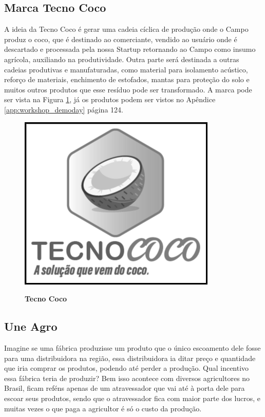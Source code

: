 \subsection{Marca Tecno Coco}

A ideia da Tecno Coco é gerar uma cadeia cíclica de produção onde o Campo produz o coco, que é destinado ao comerciante, vendido ao usuário onde é descartado e processada pela nossa Startup retornando ao Campo como insumo agrícola, auxiliando na produtividade. Outra parte será destinada a outras cadeias produtivas e manufaturadas, como material para isolamento acústico, reforço de materiais, enchimento de estofados, mantas para proteção do solo e muitos outros produtos que esse resíduo pode ser transformado. A marca pode ser vista na Figura \ref{figura_50}, já os produtos podem ser vistos no Apêndice \ref{app:workshop_demoday} página 124.


\begin{figure}[H]
\centering
\caption{\textbf{Tecno Coco}}
\includegraphics[scale=0.45]{Imagens/tecnococo.png}
\label{figura_50}
\end{figure}


\subsection{Une Agro}

Imagine se uma fábrica produzisse um produto que o único escoamento dele fosse para uma distribuidora na região, essa distribuidora ia ditar preço e quantidade que iria comprar os produtos, podendo até perder a produção. Qual incentivo essa fábrica teria de produzir? Bem isso acontece com diversos agricultores no Brasil, ficam reféns apenas de um atravessador que vai até à porta dele para escoar seus produtos, sendo que o atravessador fica com maior parte dos lucros, e muitas vezes o que paga a agricultor é só o custo da produção.


